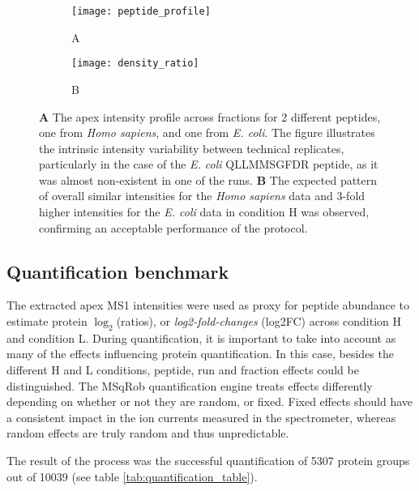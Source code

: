 \begin{figure}[H]
\begin{subfigure}{.9\textwidth}
  \centering
    \caption*{A}
\texttt{[image: peptide\_profile]}
\end{subfigure}
\bigskip

\begin{subfigure}{.9\textwidth}
  \centering
    \caption*{B}
\texttt{[image: density\_ratio]}
\end{subfigure}
\caption[Proteome benchmark apex MS1 intensity results]{\textbf{A} The apex intensity profile across fractions for 2 different peptides, one from \textit{Homo sapiens}, and one from \textit{E. coli}. The figure illustrates the intrinsic intensity variability between technical replicates, particularly in the case of the \textit{E. coli} QLLMMSGFDR peptide, as it was almost non-existent in one of the runs. \textbf{B} The expected pattern of overall similar intensities for the \textit{Homo sapiens} data and 3-fold higher intensities for the \textit{E. coli} data in condition H was observed, confirming an acceptable performance of the protocol.}
\label{fig:apex_intensity}
\end{figure}


\subsection{Quantification benchmark}
\label{subsec:quantification}

The extracted apex MS1 intensities were used as proxy for peptide abundance to estimate protein $\log_2$(ratios), or \textit{log2-fold-changes} (\ac{log2FC}) across condition H and condition L. During quantification, it is important to take into account as many of the effects influencing protein quantification. In this case, besides the different H and L conditions, peptide, run and fraction effects could be distinguished. The MSqRob quantification engine treats effects differently depending on whether or not they are random, or fixed. Fixed effects should have a consistent impact in the ion currents measured in the spectrometer, whereas random effects are truly random and thus unpredictable.

The result of the process was the successful quantification of 5307 protein groups out of 10039 (see table \ref{tab:quantification_table}).

